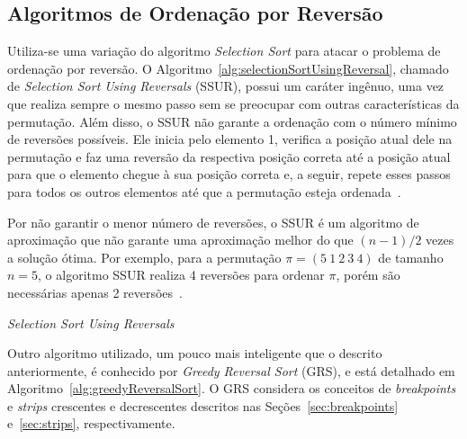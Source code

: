 \documentclass[runningheads,a4paper]{llncs}
\begin{document}
\subsection{Algoritmos de Ordenação por Reversão}
\label{sec:algoritmos}

Utiliza-se uma variação do algoritmo \textit{Selection Sort} para atacar o problema de ordenação por reversão. O Algoritmo~\ref{alg:selectionSortUsingReversal}, chamado de \textit{Selection Sort Using Reversals} (SSUR), possui um caráter ingênuo, uma vez que realiza sempre o mesmo passo sem se preocupar com outras características da permutação. Além disso, o SSUR não garante a ordenação com o número mínimo de reversões possíveis. Ele inicia pelo elemento 1, verifica a posição atual dele na permutação e faz uma reversão da respectiva posição correta até a posição atual para que o elemento chegue à sua posição correta e, a seguir, repete esses passos para todos os outros elementos até que a permutação esteja ordenada~\cite{Jones}.

Por não garantir o menor número de reversões, o SSUR é um algoritmo de aproximação que não garante uma aproximação melhor do que $(n-1)/2$ vezes a solução ótima. Por exemplo, para a permutação $\pi=(5 \ 1 \ 2 \ 3 \ 4)$ de tamanho $n=5$, o algoritmo SSUR realiza 4 reversões para ordenar $\pi$, porém são necessárias apenas 2 reversões~\cite{Jones}.

\begin{algorithm}[ht]
\caption{\textit{Selection Sort Using Reversals}}
\label{alg:selectionSortUsingReversal}
\end{algorithm}

Outro algoritmo utilizado, um pouco mais inteligente que o descrito anteriormente, é conhecido por \textit{Greedy Reversal Sort} (GRS), e está detalhado em Algoritmo~\ref{alg:greedyReversalSort}. O GRS considera os conceitos de \textit{breakpoints} e \textit{strips} crescentes e decrescentes descritos nas Seções~\ref{sec:breakpoints} e~\ref{sec:strips}, respectivamente.
\end{document}
